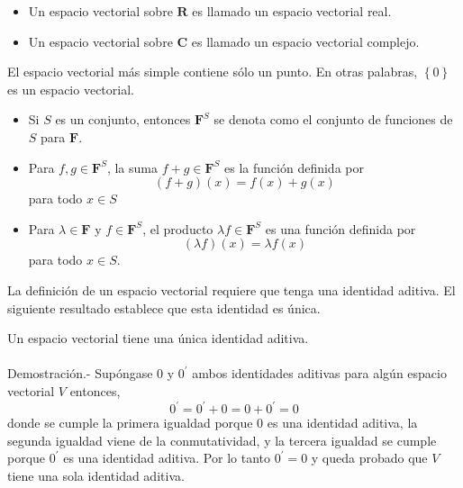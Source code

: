     \begin{mydef}\hfill
	\begin{itemize}
	    \item Un espacio vectorial sobre $\textbf{R}$ es llamado un espacio vectorial real.
	    \item Un espacio vectorial sobre $\textbf{C}$ es llamado un espacio vectorial complejo.
	\end{itemize}
    \end{mydef}

    El espacio vectorial más simple contiene sólo un punto. En otras palabras, $\left\{0\right\}$ es un espacio vectorial.

\setcounter{mynot}{22}
    \begin{mynot}\hfill
	\begin{itemize}
	    \item Si $S$ es un conjunto, entonces $\textbf{F}^S$ se denota como el conjunto de funciones de $S$ para $\textbf{F}$.
	    \item Para $f,g\in \textbf{F}^S$, la suma $f+g\in \textbf{F}^S$ es la función definida por $$(f+g)(x)=f(x)+g(x)$$ para todo $x\in S$
	    \item Para $\lambda \in \textbf{F}$ y $f\in \textbf{F}^S$, el producto $\lambda f \in \textbf{F}^S$ es una función definida por $$(\lambda f)(x)=\lambda f(x)$$
		para todo $x\in S$.
	\end{itemize}
    \end{mynot}

La definición de un espacio vectorial requiere que tenga una identidad aditiva. El siguiente resultado establece que esta identidad es única.\\

\setcounter{myteo}{24}
\begin{myteo}
    Un espacio vectorial tiene una única identidad aditiva.\\\\
	Demostración.-\; Supóngase $0$ y $0^{'}$ ambos identidades aditivas para algún espacio vectorial $V$ entonces,
	$$0^{'}=0^{'}+0=0+0^{'}=0$$
	donde se cumple la primera igualdad porque $0$ es una identidad aditiva, la segunda igualdad viene de la conmutatividad, y la tercera igualdad se cumple porque $0^{'}$ es una identidad aditiva. Por lo tanto $0^{'}=0$ y queda probado que $V$ tiene una sola identidad aditiva.
\end{myteo}
\vspace{0.3cm}

